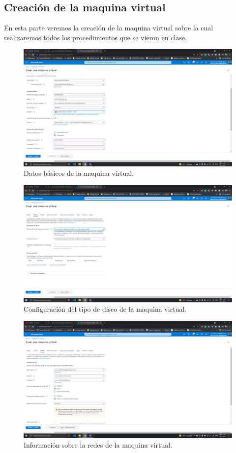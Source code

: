 \documentclass[11pt]{article}
\begin{document}
		\subsection{Creación de la maquina virtual}
En esta parte veremos la creación de la maquina virtual sobre la cual realizaremos todos los procedimientos que se vieron en clase.
		\begin{figure}[H]
			\centering
			\includegraphics[scale=0.34]{resources/datosbasicos.png}
			\caption{Datos básicos de la maquina virtual.}\label{fig:picture}
		\end{figure}
		\begin{figure}[H]
			\centering
			\includegraphics[scale=0.34]{resources/datosdisco.png}
			\caption{Configuración del tipo de disco de la maquina virtual.}\label{fig:picture}
		\end{figure}
		\begin{figure}[H]
			\centering
			\includegraphics[scale=0.34]{resources/datosredes.png}
			\caption{Información sobre la redes de la maquina virtual.}\label{fig:picture}
		\end{figure}
\end{document}
